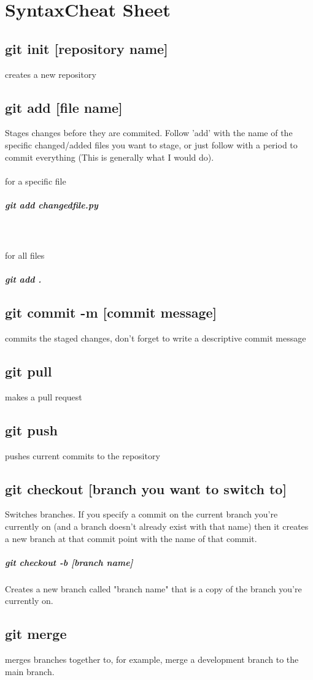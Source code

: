 \documentclass{article}
\begin{document}
\section{SyntaxCheat Sheet}
\subsection{git init [repository name]}
creates a new repository
\subsection{git add [file name]}
Stages changes before they are commited. Follow 'add' with the name of the specific changed/added files you want to stage, or just follow with a period to commit everything (This is generally what I would do). \\ \\
for a specific file
\subparagraph{git add changedfile.py} \mbox{}\\
\\ for all files 
\subparagraph{git add .}

\subsection{git commit -m [commit message]}
commits the staged changes, don't forget to write a descriptive commit message
\subsection{git pull}
makes a pull request
\subsection{git push}
pushes current commits to the repository
\subsection{git checkout [branch you want to switch to]}
Switches branches. If you specify a commit on the current branch you're currently on (and a branch doesn't already exist with that name) then it creates a new branch at that commit point with the name of that commit.
	\subparagraph{git checkout -b [branch name]}
	Creates a new branch called "branch name" that is a copy of the branch you're currently on.
\subsection{git merge}
merges branches together to, for example, merge a development branch to the main branch.
\end{document}
